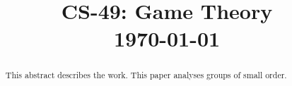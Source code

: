 \title{CS-49: Game Theory\\ \today}

\begin{titlingpage}
  
  
  \begin{abstract}
    This abstract describes the work.
    This paper analyses groups of small order.
  \end{abstract}
  \maketitle
  
\end{titlingpage}
